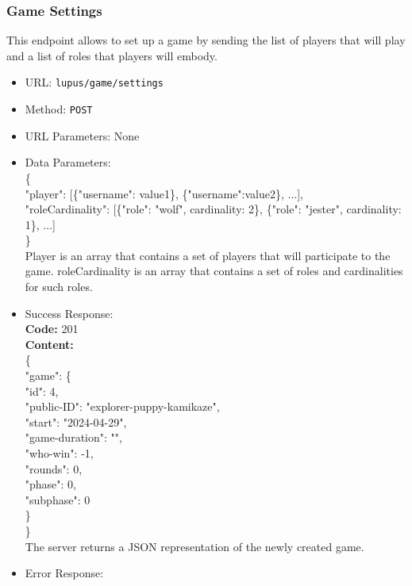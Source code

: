 \subsubsection*{Game Settings}
This endpoint allows to set up a game by sending the list of players that will play and a list of roles that players will embody.

\begin{itemize}
    \item URL: \texttt{lupus/game/settings}
    \item Method: \texttt{POST}
    \item URL Parameters: None
    \item Data Parameters:\\
        \{\\
        \tab "player": [\{"username": value1\}, \{"username":value2\}, ...], \\
        \tab "roleCardinality": [\{"role": "wolf", cardinality: 2\}, \{"role": "jester", cardinality: 1\}, ...] \\
        \}\\
        Player is an array that contains a set of players that will participate to the game. roleCardinality is an array that contains a set of roles and cardinalities for such roles.
    \item Success Response: \\
        \textbf{Code:} 201\\
        \textbf{Content:} \\
        \{\\
        \tab  "game": \{ \\
        \tab \tab "id": 4, \\
        \tab \tab "public-ID": "explorer-puppy-kamikaze", \\
        \tab \tab "start": "2024-04-29", \\
        \tab \tab "game-duration": "", \\
        \tab \tab "who-win": -1, \\ 
        \tab \tab "rounds": 0, \\
        \tab \tab "phase": 0, \\
        \tab \tab "subphase": 0 \\
        \tab\}\\
        \} \\
        The server returns a JSON representation of the newly created game.
    \item Error Response:\\

\end{itemize}
